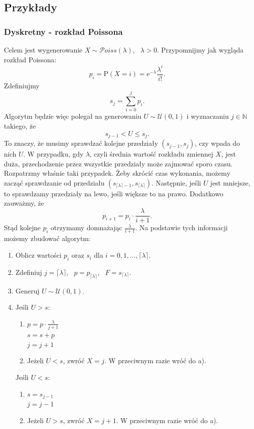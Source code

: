 \documentclass[12pt]{mwrep}
\begin{document}
	\subsection{Przykłady}
	
	\subsubsection{Dyskretny - rozkład Poissona}
	\noindent Celem jest wygenerowanie $X \sim \mathcal{P}oiss(\lambda)$, \ $\lambda > 0$. Przypomnijmy jak wygląda rozkład \mbox{Poissona}:
	$$ p_i = \mathrm{P}(X = i) = \mathrm{e}^{-\lambda} \frac{\lambda^i}{i!}. $$
	Zdefiniujmy
	$$ s_j = \sum\limits_{i=0}^{j} p_i. $$
	Algorytm będzie więc polegał na generowaniu $U \sim \mathcal{U}(0, 1)$ i wyznaczaniu $j \in \mathbb{N} $ takiego, że 
	$$ s_{j -1} < U \leqslant s_j. $$
	To znaczy, że musimy sprawdzać kolejne przedziały $(s_{j-1}, s_j)$, czy wpada do nich $U$. W przypadku, gdy $\lambda$, czyli średnia wartość rozkładu zmiennej $X$, jest duża, przechodzenie przez wszystkie przedziały może zajmować sporo czasu. Rozpatrzmy właśnie taki przypadek. Żeby skrócić czas wykonania, możemy zacząć sprawdzanie od przedziału $ (s_{\lceil \lambda \rceil -1}, s_{\lceil \lambda \rceil}) $. Następnie, jeśli $U$ jest mniejsze, to sprawdzamy przedziały na lewo, jeśli większe to na prawo. Dodatkowo zauważmy, że
	$$ p_{i + 1} = p_i \cdot \frac{\lambda}{i + 1}. $$
	Stąd kolejne $p_i$ otrzymamy domnażając $\frac{\lambda}{i + 1}$. Na podstawie tych informacji możemy zbudować algorytm:
	\begin{enumerate}[leftmargin=10mm]
		\item Oblicz wartości $p_i$ oraz $s_i$ dla $i = 0, 1, \dots, \lceil\lambda\rceil$.
		\item Zdefiniuj $j = \lceil \lambda \rceil$, \ $p = p_{\lceil\lambda\rceil}$, \ $F = s_{\lceil\lambda\rceil}$.
		\item Generuj $U \sim \mathcal{U}(0, 1)$.
		\item Jeśli $U > s$:
		\begin{enumerate}[leftmargin=10mm]
			\item $p = p \cdot \frac{\lambda}{j+1}$\\
			$s = s + p$\\
			$j = j + 1$
			\item Jeżeli $U < s$, zwróć $X = j$. W przeciwnym razie wróć do a).
		\end{enumerate}
		Jeśli $U < s$:
		\begin{enumerate}[leftmargin=10mm]
			\item $s = s_{j-1}$\\
			$j = j - 1$
			\item Jeżeli $U > s$, zwróć $X = j + 1$. W przeciwnym razie wróć do a).
		\end{enumerate}
	\end{enumerate}
\end{document}
